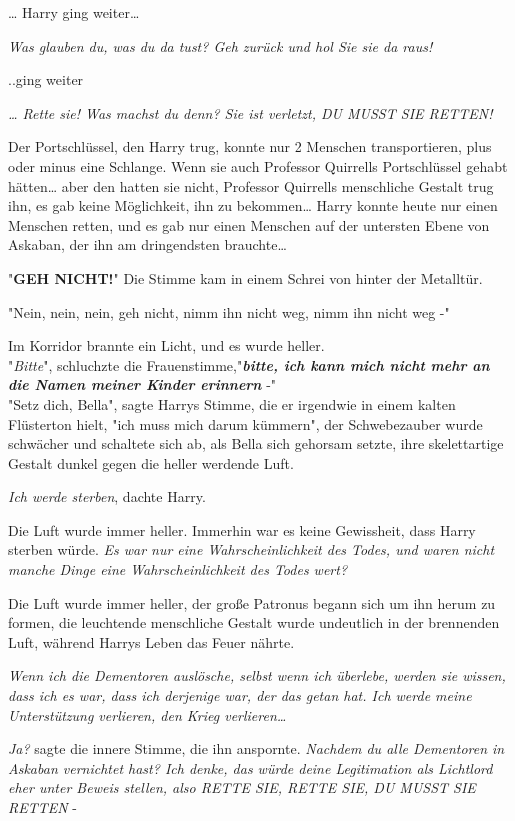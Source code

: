 {… Harry ging weiter…

\emph{Was glauben du, was du da tust? Geh zurück und hol Sie sie da raus!}

..ging weiter

\emph{… Rette sie! Was machst du denn? Sie ist verletzt, DU MUSST SIE RETTEN!}

Der Portschlüssel, den Harry trug, konnte nur 2 Menschen transportieren, plus oder minus eine Schlange. Wenn sie auch Professor Quirrells Portschlüssel gehabt hätten… aber den hatten sie nicht, Professor Quirrells menschliche Gestalt trug ihn, es gab keine Möglichkeit, ihn zu bekommen… Harry konnte heute nur einen Menschen retten, und es gab nur einen Menschen auf der untersten Ebene von Askaban, der ihn am dringendsten brauchte…

"\textbf{GEH NICHT!}" Die Stimme kam in einem Schrei von hinter der Metalltür.

"Nein, nein, nein, geh nicht, nimm ihn nicht weg, nimm ihn nicht weg -"

Im Korridor brannte ein Licht, und es wurde heller.\\

"\emph{Bitte}", schluchzte die Frauenstimme,"\textbf{\emph{bitte, ich kann mich nicht mehr an die Namen meiner Kinder erinnern}} -"\\

"Setz dich, Bella", sagte Harrys Stimme, die er irgendwie in einem kalten Flüsterton hielt, "ich muss mich darum kümmern", der Schwebezauber wurde schwächer und schaltete sich ab, als Bella sich gehorsam setzte, ihre skelettartige Gestalt dunkel gegen die heller werdende Luft.

\emph{Ich werde sterben}, dachte Harry.

Die Luft wurde immer heller. Immerhin war es keine Gewissheit, dass Harry sterben würde. \emph{Es war nur eine Wahrscheinlichkeit des Todes, und waren nicht manche Dinge eine Wahrscheinlichkeit des Todes wert?}

Die Luft wurde immer heller, der große Patronus begann sich um ihn herum zu formen, die leuchtende menschliche Gestalt wurde undeutlich in der brennenden Luft, während Harrys Leben das Feuer nährte.

\emph{Wenn ich die Dementoren auslösche, selbst wenn ich überlebe, werden sie wissen, dass ich es war, dass ich derjenige war, der das getan hat. Ich werde meine Unterstützung verlieren, den Krieg verlieren…}

\emph{Ja?} sagte die innere Stimme, die ihn anspornte. \emph{Nachdem du alle Dementoren in Askaban vernichtet hast? Ich denke, das würde deine Legitimation als Lichtlord eher unter Beweis stellen, also RETTE SIE, RETTE SIE, DU MUSST SIE RETTEN} -

}
